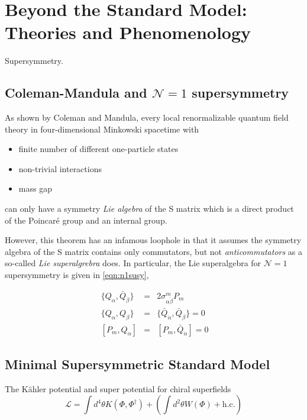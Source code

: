 \chapter{Beyond the Standard Model: Theories and Phenomenology}


Supersymmetry.
\section{Coleman-Mandula and $\mathcal{N}=1$ supersymmetry}

As shown by Coleman and Mandula, every local renormalizable quantum
field theory in four-dimensional Minkowski spacetime with
\begin{itemize}
\item finite number of different one-particle states
\item non-trivial interactions
\item mass gap
\end{itemize}
can only have a symmetry \emph{Lie algebra} of the S matrix which is a
direct product of the Poincar\'{e} group and an internal group.

However, this theorem has an infamous loophole in that it assumes the
symmetry algebra of the S matrix contains only commutators, but not
\emph{anticommutators} as a so-called \emph{Lie superalgrebra}
does. In particular, the Lie superalgebra for $\mathcal N=1$
supersymmetry is given in \ref{eqn:n1susy},

\begin{eqnarray}
~\{ Q_{\alpha},\bar Q_{\dot{\beta}}\} &=& 2\sigma^m_{\alpha\dot\beta} P_m \nonumber\\
~\{ Q_{\alpha},Q_{\beta}\} &=& \{ \bar Q_{\dot\alpha},\bar Q_{\dot\beta}\} = 0\nonumber\\
~[ P_m, Q_{\alpha}] &=& [P_m,\bar Q_{\dot\alpha}] = 0
\label{eqn:n1susy}
\end{eqnarray}

\section{Minimal Supersymmetric Standard Model}
The K\"{a}hler potential and super potential for chiral superfields
\begin{equation}
\mathcal L = \int d^4\theta K(\Phi,\Phi^{\dagger}) + \left (\int
  d^2\theta W(\Phi) + \mathrm{h.c.} \right)
\label{eqn:mssmlag}
\end{equation}

